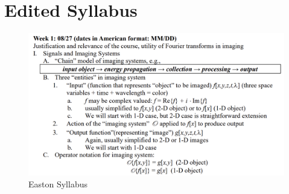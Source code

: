 \documentclass{article}
\begin{document}






















\clearpage
\section{Edited Syllabus}
\begin{figure}[h!]
\centering
\includegraphics[scale=.60]{Fourier/Week 1/Week1.1.png}
\caption{Easton Syllabus}
\label{fig:Snowman}
\end{figure}
\end{document}
